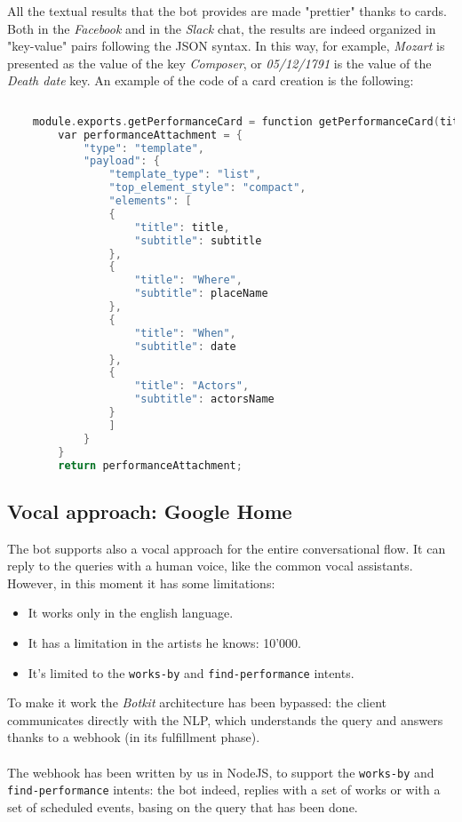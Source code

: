 	All the textual results that the bot provides are made "prettier" thanks to cards. Both in the \textit{Facebook} and in the \textit{Slack} chat, the results are indeed organized in "key-value" pairs following the JSON syntax. In this way, for example, \textit{Mozart} is presented as the value of the key \textit{Composer}, or \textit{05/12/1791} is the value of the \textit{Death date} key. An example of the code of a card creation is the following:
	\begin{lstlisting}[language=C]
	
	module.exports.getPerformanceCard = function getPerformanceCard(title, subtitle, placeName, actorsName, date) {  
		var performanceAttachment = {
			"type": "template",
			"payload": {
				"template_type": "list",
				"top_element_style": "compact",
				"elements": [
				{
					"title": title,
					"subtitle": subtitle
				},
				{
					"title": "Where",
					"subtitle": placeName
				},
				{
					"title": "When",
					"subtitle": date        
				},
				{
					"title": "Actors",
					"subtitle": actorsName        
				}
				] 
			}
		}
		return performanceAttachment;
	\end{lstlisting}
	
	\subsection{Vocal approach: Google Home}
	The bot supports also a vocal approach for the entire conversational flow. It can reply to the queries with a human voice, like the common vocal assistants. However, in this moment it has some limitations:
	\begin{itemize}
		\item It works only in the english language.
		\item It has a limitation in the artists he knows: 10'000.
		\item It's limited to the \texttt{works-by} and \texttt{find-performance} intents.
	\end{itemize}

	To make it work the \textit{Botkit} architecture has been bypassed: the client communicates directly with the NLP, which understands the query and answers thanks to a webhook (in its fulfillment phase).\\\\
	The webhook has been written by us in NodeJS, to support the \texttt{works-by} and \texttt{find-performance} intents: the bot indeed, replies with a set of works or with a set of scheduled events, basing on the query that has been done.
	

